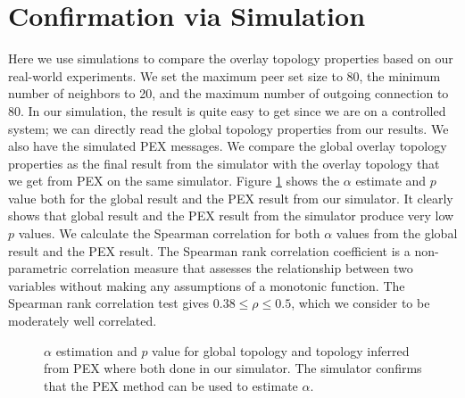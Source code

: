 \documentclass[10pt,conference,letterpaper,final]{IEEEtran}
\begin{document}
\section{Confirmation via Simulation}\label{simulation}
Here we use simulations to compare the overlay topology properties based  on our real-world experiments. 
We set the maximum peer set size to 80, the minimum number of neighbors to 20, and the maximum number of outgoing connection to 80. In our simulation, the result is quite easy to get since we are on a controlled system;  we can directly read the  global topology properties from our results. 
We also have the simulated PEX messages. We compare the global overlay topology properties as the final result from the simulator with the overlay topology that we get from PEX on the same simulator.
Figure \ref{fig:simulation} shows the $\alpha$ estimate and $p$ value both for the global result and the PEX result from our simulator. 
It clearly shows that global result and the PEX result from the simulator produce very low $p$ values. 
We calculate the Spearman correlation for both $\alpha$ values from the global result and the PEX result. 
The Spearman rank correlation coefficient is a non-parametric correlation measure that assesses the relationship between two variables
without making any assumptions of a monotonic function.
The Spearman rank correlation test gives $0.38 \leq \rho \leq 0.5$, which we consider to be moderately well correlated. 

\begin{figure}
\centering
{}
\caption{$\alpha$ estimation and $p$ value for global topology and topology inferred from PEX where both done in our simulator.
The simulator confirms that the PEX method can be used to estimate $\alpha$.} 
\label{fig:simulation}
\end{figure}
\end{document}
